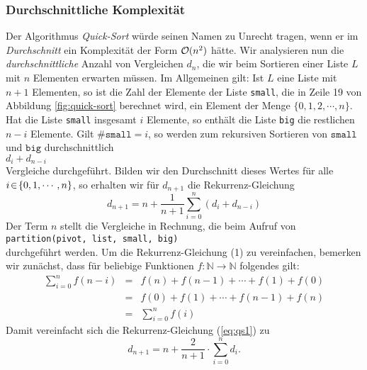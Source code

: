 \subsubsection{Durchschnittliche Komplexit\"at}
Der Algorithmus \emph{Quick-Sort} w\"urde seinen Namen zu Unrecht tragen, wenn er im
\emph{Durchschnitt} ein Komplexit\"at der Form $\mathcal{O}(n^2)$ h\"atte.  Wir analysieren nun die
\emph{durchschnittliche} Anzahl von Vergleichen $d_{n}$, die wir beim Sortieren einer
Liste $L$ mit $n$ Elementen erwarten m\"ussen.  Im Allgemeinen gilt: Ist $L$ eine Liste
mit $n+1$ Elementen, so ist die Zahl der Elemente der Liste \texttt{small}, die in Zeile 19
von Abbildung \ref{fig:quick-sort} berechnet wird, ein Element der Menge
$\{0,1,2,\cdots,n\}$.  Hat die Liste \texttt{small} insgesamt $i$ Elemente, so enth\"alt die
Liste \texttt{big} die restlichen $n-i$ Elemente.  Gilt $\#\mathtt{small} = i$, so werden
zum rekursiven Sortieren von $\mathtt{small}$ und $\mathtt{big}$ durchschnittlich
\\[0.2cm]
\hspace*{1.3cm} $d_i + d_{n-i}$ \\[0.2cm]
Vergleiche durchgef\"uhrt.  Bilden wir den Durchschnitt dieses Wertes f\"ur alle $i \!\in\!
\{0,1,\cdots,n\}$, so erhalten wir
f\"ur $d_{n+1}$ die Rekurrenz-Gleichung 
\begin{equation}
  \label{eq:qs1}
  d_{n+1} = n + \frac{1}{n+1} \sum_{i=0}^n (d_i + d_{n-i})  
\end{equation}
Der Term $n$ stellt die Vergleiche in Rechnung, die beim Aufruf von 
\\[0.2cm]
\hspace*{1.3cm}
\texttt{partition(pivot, list, small, big)}
\\[0.2cm]
durchgef\"uhrt werden.  Um die Rekurrenz-Gleichung (1) zu vereinfachen, bemerken wir
zun\"achst, dass f\"ur beliebige Funktionen $f:\mathbb{N} \rightarrow \mathbb{N}$ folgendes gilt:
\begin{eqnarray}
\sum_{i=0}^n f(n-i) & = & f(n) + f(n-1) + \cdots + f(1) + f(0) \\
                    & = & f(0) + f(1) + \cdots + f(n-1) + f(n) \\
 \label{eq:qssum}
                    & = & \sum_{i=0}^n f(i) 
\end{eqnarray}
Damit vereinfacht sich die Rekurrenz-Gleichung (\ref{eq:qs1}) zu 
\begin{equation}
  \label{eq:qs2}
  d_{n+1} = n + \frac{2}{n+1} \cdot \sum_{i=0}^n d_i.   
\end{equation}
